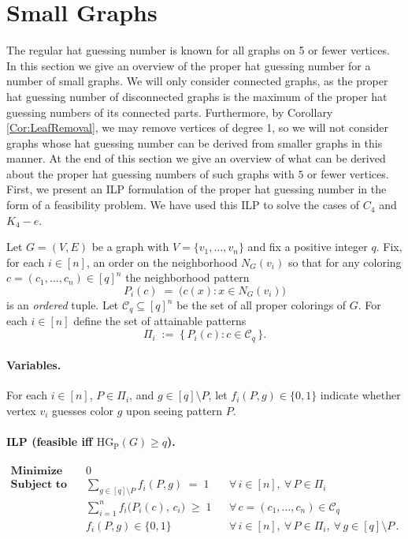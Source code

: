 \documentclass[a4paper,11pt]{amsproc}
\theoremstyle{plain}
\theoremstyle{definition}
\newcommand{\HGP}{\mathrm{HG_{P}}}
\begin{document}
\section{Small Graphs}
\label{sec:small_graphs}

The regular hat guessing number is known for all graphs on 5 or fewer vertices. In this section we give an overview of the proper hat guessing number for a number of small graphs. We will only consider connected graphs, as the proper hat guessing number of disconnected graphs is the maximum of the proper hat guessing numbers of its connected parts. Furthermore, by Corollary \ref{Cor:LeafRemoval}, we may remove vertices of degree 1, so we will not consider graphs whose hat guessing number can be derived from smaller graphs in this manner. At the end of this section we give an overview of what can be derived about the proper hat guessing numbers of such graphs with $5$ or fewer vertices. First, we present an ILP formulation of the proper hat guessing number in the form of a feasibility problem. 
We have used this ILP to solve the cases of $C_4$ and $K_4 - e$. 

Let $G=(V,E)$ be a graph with $V=\{v_1,\dots,v_n\}$ and fix a positive integer $q$.
Fix, for each $i\in[n]$, an order on the neighborhood $N_G(v_i)$ so that for any
coloring $c=(c_1,\dots,c_n)\in [q]^n$ the neighborhood pattern
\[
P_i(c)\;=\;\bigl(c(x):x\in N_G(v_i)\bigr)
\]
is an \emph{ordered} tuple. Let $\mathcal{C}_q\subseteq [q]^n$ be the set of all proper
colorings of $G$. For each $i\in[n]$ define the set of attainable patterns
\[
\Pi_i \;:=\; \{\,P_i(c): c\in \mathcal{C}_q\,\}.
\]

\paragraph{Variables.}
For each $i\in[n]$, $P\in\Pi_i$, and $g\in [q]\setminus P$,
let $f_i(P,g)\in\{0,1\}$ indicate whether vertex $v_i$ guesses color $g$ upon seeing
pattern $P$.

\paragraph{ILP (feasible iff $\HGP(G)\ge q$).}
\begin{align*}
\textbf{Minimize}\quad & 0 \\[-2pt]
\textbf{Subject to}\quad
& \sum_{g\in [q]\setminus P} f_i(P,g) \;=\; 1
&& \forall\, i\in[n],\ \forall\, P\in \Pi_i \\[4pt]
& \sum_{i=1}^{n} f_i\!\bigl(P_i(c),\, c_i\bigr) \;\ge\; 1
&& \forall\, c=(c_1,\dots,c_n)\in \mathcal{C}_q \\[4pt]
& f_i(P,g)\in\{0,1\}
&& \forall\, i\in[n],\ \forall\, P\in \Pi_i,\ \forall\, g\in [q]\setminus P\,.
\end{align*}
\end{document}
